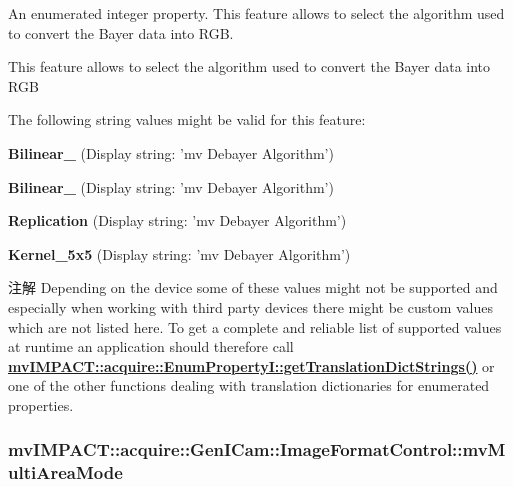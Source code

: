 An enumerated integer property. This feature allows to select the algorithm used to convert the Bayer data into R\+G\+B. 

This feature allows to select the algorithm used to convert the Bayer data into R\+G\+B

The following string values might be valid for this feature\+:
\begin{DoxyItemize}
\item {\bfseries Bilinear\+\_} (Display string\+: 'mv Debayer Algorithm')
\item {\bfseries Bilinear\+\_} (Display string\+: 'mv Debayer Algorithm')
\item {\bfseries Replication} (Display string\+: 'mv Debayer Algorithm')
\item {\bfseries Kernel\+\_\+5x5} (Display string\+: 'mv Debayer Algorithm')
\end{DoxyItemize}

\begin{DoxyNote}{注解}
Depending on the device some of these values might not be supported and especially when working with third party devices there might be custom values which are not listed here. To get a complete and reliable list of supported values at runtime an application should therefore call {\bfseries \hyperlink{classmv_i_m_p_a_c_t_1_1acquire_1_1_enum_property_i_a0ba6ccbf5ee69784d5d0b537924d26b6}{mv\+I\+M\+P\+A\+C\+T\+::acquire\+::\+Enum\+Property\+I\+::get\+Translation\+Dict\+Strings()}} or one of the other functions dealing with translation dictionaries for enumerated properties. 
\end{DoxyNote}
\hypertarget{classmv_i_m_p_a_c_t_1_1acquire_1_1_gen_i_cam_1_1_image_format_control_ace1cd2b204ca9e46d5408f2d1fff86d8}{
\subsubsection[{mv\+Multi\+Area\+Mode}]{ mv\+I\+M\+P\+A\+C\+T\+::acquire\+::\+Gen\+I\+Cam\+::\+Image\+Format\+Control\+::mv\+Multi\+Area\+Mode}}\label{classmv_i_m_p_a_c_t_1_1acquire_1_1_gen_i_cam_1_1_image_format_control_ace1cd2b204ca9e46d5408f2d1fff86d8}


